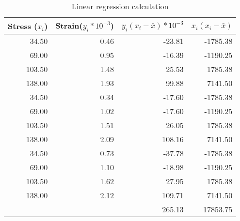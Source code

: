 \begin{exercise}{4}
\begin{table}[H]
\centering
\begin{tabular}{|rrrr|}
\hline
\multicolumn{1}{|c|}{\textbf{Stress ($x_i$)}} & \multicolumn{1}{c|}{\textbf{Strain($y_i*10^{-3}$)}} & \multicolumn{1}{c|}{\textbf{$y_i(x_i-\overline{x})*10^{-3}$}} & \multicolumn{1}{c|}{\textbf{$x_i(x_i-\overline{x})$}} \\ \hline
34.50 & 0.46 & -23.81 & -1785.38 \\
69.00 & 0.95 & -16.39 & -1190.25 \\
103.50 & 1.48 & 25.53 & 1785.38 \\
138.00 & 1.93 & 99.88 & 7141.50 \\
34.50 & 0.34 & -17.60 & -1785.38 \\
69.00 & 1.02 & -17.60 & -1190.25 \\
103.50 & 1.51 & 26.05 & 1785.38 \\
138.00 & 2.09 & 108.16 & 7141.50 \\
34.50 & 0.73 & -37.78 & -1785.38 \\
69.00 & 1.10 & -18.98 & -1190.25 \\
103.50 & 1.62 & 27.95 & 1785.38 \\
138.00 & 2.12 & 109.71 & 7141.50 \\ \hline
 &  & 265.13 & 17853.75 \\ \hline
\end{tabular}
\caption{Linear regression calculation}
\label{linear-regression-calculation}
\end{table}


\end{exercise}


